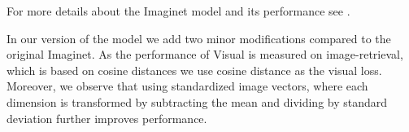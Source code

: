 For more details about the {\sc Imaginet} model and 
its performance see .

In our version of the model we add two minor modifications 
compared to the original {\sc Imaginet}. As the performance of
{\sc Visual} is measured on image-retrieval, which is based on cosine 
distances we use cosine distance as the visual loss.
Moreover, we observe that using standardized image vectors, where each dimension 
is transformed by subtracting the mean and dividing by standard deviation further
improves performance.





